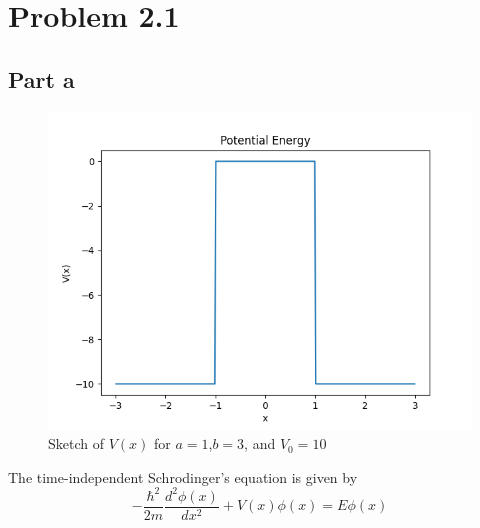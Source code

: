 \documentclass[12pt]{report}
\begin{document}
\maketitle
\section*{Problem 2.1}
\subsection*{Part a}
\begin{figure}[H]
    \centering
    \includegraphics[scale=0.7]{CSE_389D/ps_2/Figure_1.png}
    \caption{Sketch of $V(x)$ for $a=1$,$b=3$, and $V_0 = 10$}
    \label{fig:enter-label}
\end{figure}
The time-independent Schrodinger's equation is given by
\begin{equation*}
    -\frac{\hbar^2}{2m} \frac{d^2\phi(x)}{dx^2} + V(x) \phi(x) = E\phi(x)
\end{equation*}
\end{document}
